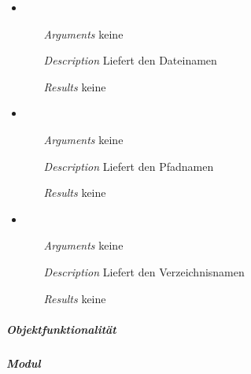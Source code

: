 \begin{itemize}
\item {}
\begin{enumerate}
\item[\textit{Arguments}] keine
\item[\textit{Description}] Liefert den Dateinamen
\item[\textit{Results}] keine
\end{enumerate}

\item {}
\begin{enumerate}
\item[\textit{Arguments}] keine 
\item[\textit{Description}] Liefert den Pfadnamen
\item[\textit{Results}] keine
\end{enumerate}

\item {}
\begin{enumerate}
\item[\textit{Arguments}] keine
\item[\textit{Description}] Liefert den Verzeichnisnamen
\item[\textit{Results}] keine
\end{enumerate}

\end{itemize}



\newpage

\subparagraph{Objektfunktionalit\"at}



\newpage

\paragraph{}
\subparagraph{Modul} 


